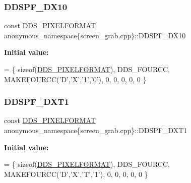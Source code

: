\subsubsection{\texorpdfstring{D\+D\+S\+P\+F\+\_\+\+D\+X10}{DDSPF\_DX10}}
{\footnotesize\ttfamily const \mbox{\hyperlink{structanonymous__namespace_02screen__grab_8cpp_03_1_1_d_d_s___p_i_x_e_l_f_o_r_m_a_t}{D\+D\+S\+\_\+\+P\+I\+X\+E\+L\+F\+O\+R\+M\+AT}} anonymous\+\_\+namespace\{screen\+\_\+grab.\+cpp\}\+::D\+D\+S\+P\+F\+\_\+\+D\+X10}

{\bfseries Initial value\+:}
\begin{DoxyCode}
=
        \{ \textcolor{keyword}{sizeof}(\mbox{\hyperlink{struct_d_d_s___p_i_x_e_l_f_o_r_m_a_t}{DDS\_PIXELFORMAT}}), DDS\_FOURCC, MAKEFOURCC(\textcolor{charliteral}{'D'},\textcolor{charliteral}{'X'},\textcolor{charliteral}{'1'},\textcolor{charliteral}{'0'}), 0, 0, 0, 0, 0 \}
\end{DoxyCode}
\mbox{\label{namespaceanonymous__namespace_02screen__grab_8cpp_03_a52971a3b32f88a41ba10319209620f61}} 
\subsubsection{\texorpdfstring{D\+D\+S\+P\+F\+\_\+\+D\+X\+T1}{DDSPF\_DXT1}}
{\footnotesize\ttfamily const \mbox{\hyperlink{structanonymous__namespace_02screen__grab_8cpp_03_1_1_d_d_s___p_i_x_e_l_f_o_r_m_a_t}{D\+D\+S\+\_\+\+P\+I\+X\+E\+L\+F\+O\+R\+M\+AT}} anonymous\+\_\+namespace\{screen\+\_\+grab.\+cpp\}\+::D\+D\+S\+P\+F\+\_\+\+D\+X\+T1}

{\bfseries Initial value\+:}
\begin{DoxyCode}
=
        \{ \textcolor{keyword}{sizeof}(\mbox{\hyperlink{struct_d_d_s___p_i_x_e_l_f_o_r_m_a_t}{DDS\_PIXELFORMAT}}), DDS\_FOURCC, MAKEFOURCC(\textcolor{charliteral}{'D'},\textcolor{charliteral}{'X'},\textcolor{charliteral}{'T'},\textcolor{charliteral}{'1'}), 0, 0, 0, 0, 0 \}
\end{DoxyCode}
\mbox{\label{namespaceanonymous__namespace_02screen__grab_8cpp_03_af65ddd1a80c5c9866e9d8171398ea4f8}} 
